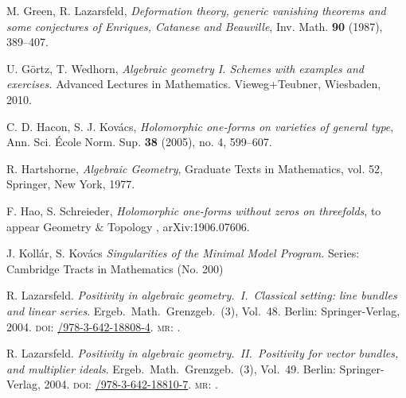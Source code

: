 \documentclass[a4paper,12pt,reqno]{amsart}
\theoremstyle{plain}
\theoremstyle{definition}
\theoremstyle{remark}
\begin{document}
\begin{thebibliography}{HKLR}
 M. Green, R. Lazarsfeld, \textit{Deformation theory, generic vanishing theorems and some conjectures of Enriques, Catanese and Beauville}, Inv. Math. \textbf{90} (1987), 389--407.

 U. G\"ortz, T. Wedhorn, \textit{Algebraic geometry I. Schemes with examples and exercises.} Advanced Lectures in Mathematics. Vieweg+Teubner, Wiesbaden, 2010. 

 C. D. Hacon, S. J. Kov\'acs, \textit{Holomorphic one-forms on varieties of general type}, Ann. Sci. \'Ecole Norm. Sup. \textbf{38} (2005), no. 4, 599--607.

 R. Hartshorne, \textit{Algebraic Geometry}, Graduate Texts in Mathematics, vol. 52, Springer, New York,
1977.

 F. Hao, S. Schreieder, \textit{Holomorphic one-forms without zeros on threefolds}, to appear Geometry $\&$ Topology , arXiv:1906.07606.

 J. Koll\'ar, S. Kov\'acs {\it Singularities of the Minimal Model Program.}
Series: Cambridge Tracts in Mathematics (No. 200)

    R. Lazarsfeld. \textit{Positivity in algebraic geometry.\ I.\ Classical
    setting: line bundles and linear series}.
    Ergeb.\ Math.\ Grenzgeb.\ (3), Vol.\ 48. Berlin: Springer-Verlag, 2004.
    \textsc{doi}: \href{https://doi.org/10.1007/978-3-642-18808-4}{/978-3-642-18808-4}.
    \textsc{mr}: \href{http://www.ams.org/mathscinet-getitem?mr=2095471}{}.


    R. Lazarsfeld. \textit{Positivity in algebraic geometry.\ II.\ Positivity
    for vector bundles, and multiplier ideals}.
    Ergeb.\ Math.\ Grenzgeb.\ (3), Vol.\ 49. Berlin: Springer-Verlag, 2004.
    \textsc{doi}: \href{https://doi.org/10.1007/978-3-642-18810-7}{/978-3-642-18810-7}.
    \textsc{mr}: \href{http://www.ams.org/mathscinet-getitem?mr=2095472}{}.




\end{thebibliography}
\end{document}
